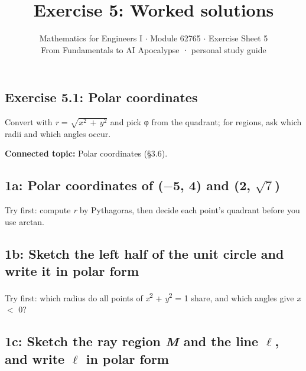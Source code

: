 \documentclass[11pt]{article}
\title{\sffamily\bfseries\color{FAUblue}Exercise 5: Worked solutions}
\author{Mathematics for Engineers I \ensuremath{\cdot} Module 62765 \ensuremath{\cdot} Exercise Sheet 5\\[2pt]\small From Fundamentals to AI Apocalypse · personal study guide}
\date{}
\begin{document}
\maketitle
\begingroup\footnotesize\setlength{\parskip}{0pt}\tableofcontents\endgroup
\clearpage

\begin{keepsection}
\section{Exercise 5.1: Polar coordinates}

Convert with \textit{r} = \ensuremath{\sqrt{{x}^{2}\, +\, {y}^{2}}} and pick φ from the quadrant; for regions, ask which radii and which angles occur.

\textbf{Connected topic:} Polar coordinates (§3.6).

\begin{keepsection}
\subsection{1a: Polar coordinates of (\ensuremath{-}5, 4) and (2, \ensuremath{\sqrt{7}})}

Try first: compute \textit{r} by Pythagoras, then decide each point’s quadrant before you use arctan.

\end{keepsection}

\begin{keepsection}
\subsection{1b: Sketch the left half of the unit circle and write it in polar form}

Try first: which radius do all points of \textit{x}\textsuperscript{2} + \textit{y}\textsuperscript{2} = 1 share, and which angles give \textit{x} \ensuremath{<} 0?

\end{keepsection}

\begin{keepsection}
\subsection{1c: Sketch the ray region \textit{M} and the line \ensuremath{\ell}, and write \ensuremath{\ell} in polar form}


\end{keepsection}
\end{keepsection}
\end{document}
